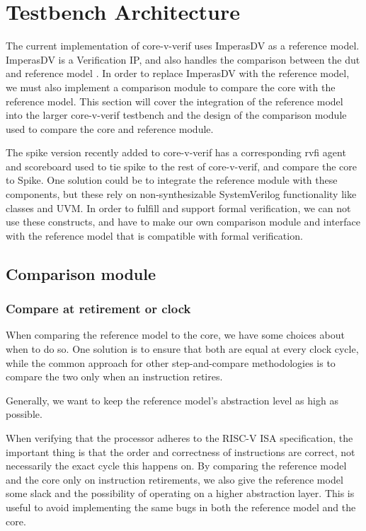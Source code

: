\section{Testbench Architecture}
\label{sec:testbench}


The current implementation of core-v-verif uses ImperasDV as a reference model. ImperasDV is a Verification IP, and also handles the comparison between the \acrshort{dut} and reference model \cite{imperassoftwareltdRISCVProcessorOVP2023}. In order to replace ImperasDV with the reference model, we must also implement a comparison module to compare the core with the reference model. This section will cover the integration of the reference model into the larger \gls{core-v-verif} testbench and the design of the comparison module used to compare the core and reference module.

The spike version recently added to core-v-verif has a corresponding rvfi agent and scoreboard used to tie spike to the rest of core-v-verif, and compare the core to Spike. One solution could be to integrate the reference module with these components,  but these rely on non-synthesizable SystemVerilog functionality \cite{mehtaIntroductionSystemVerilog2021} like classes and UVM. In order to fulfill  and support formal verification, we can not use these constructs, and have to make our own comparison module and interface with the reference model that is compatible with formal verification.


\subsection{Comparison module}
\label{sec:des_comparison}

\subsubsection{Compare at retirement or clock}
\label{sec:des_retireOrClock}

When comparing the reference model to the core, we have some choices about when to do so. One solution is to ensure that both are equal at every clock cycle, while the common approach for other step-and-compare methodologies is to compare the two only when an instruction retires.

Generally, we want to keep the reference model's abstraction level as high as possible. 

When verifying that the processor adheres to the RISC-V ISA specification, the important thing is that the order and correctness of instructions are correct, not necessarily the exact cycle this happens on. By comparing the reference model and the core only on instruction retirements, we also give the reference model some slack and the possibility of operating on a higher abstraction layer. This is useful to avoid implementing the same bugs in both the reference model and the core.

